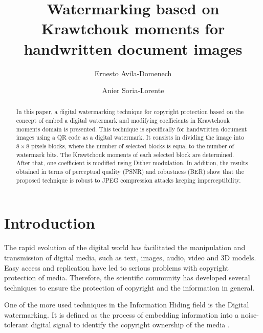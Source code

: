 \documentclass[runningheads]{llncs}
\begin{document}
%
\title{{Watermarking based on Krawtchouk moments for handwritten document images}}
%
%
\author{Ernesto Avila-Domenech \and Anier Soria-Lorente}
%
%
%
\maketitle              %
%
\begin{abstract}
In this paper, a digital watermarking technique for copyright protection based on the concept of embed a digital watermark and modifying coefficients in Krawtchouk moments domain is presented. This technique is specifically for handwritten document images using a QR code as a digital watermark. It consists in dividing the image into $8\times 8$ pixels blocks, where the number of selected blocks is equal to the number of watermark bits. The Krawtchouk moments of each selected block are determined. After that, one coefficient is modified using Dither modulation. In addition, the results obtained in terms of perceptual quality (PSNR) and robustness (BER) show that the proposed technique is robust to JPEG compression attacks keeping imperceptibility.

\end{abstract}
%
%
%
\section{Introduction}
The rapid evolution of the digital world has facilitated the manipulation and
transmission of digital media, such as text, images, audio, video and 3D models. Easy access and replication have led to serious problems with copyright protection of media. Therefore, the scientific community has developed several techniques to ensure the protection of copyright and the information in general.

	One of the more used techniques in the Information Hiding field is the Digital watermarking. It is defined as the process of embedding	information  into  a  noise-tolerant  digital  signal to  identify  the  copyright  ownership  of the  media \cite{nin2013digital}.
	
\end{document}
